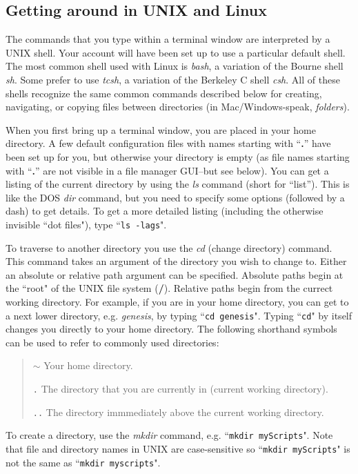 \documentclass[12pt]{article}
\begin{document}
\subsection*{Getting around in UNIX and Linux}

The commands that you type within a terminal window are interpreted by a UNIX shell. Your account will have been set up to use a particular default shell. The most common shell used with Linux is {\it bash}, a variation of the Bourne shell {\it sh}. Some prefer to use {\it tcsh}, a variation of the Berkeley C shell {\it csh}. All of these shells recognize the same common commands described below for creating, navigating, or copying files between directories (in Mac/Windows-speak, {\it folders}).

When you first bring up a terminal window, you are placed in your home directory. A few default configuration files with names starting with ``{\bf .}'' have been set up for you, but otherwise your directory is empty (as file names starting with ``{\bf .}'' are not visible in a file manager GUI--but see below). You can get a listing of the current directory by using the {\it ls} command (short for ``list''). This is like the DOS {\it dir} command, but you need to specify some options (followed by a dash) to get details. To get a more detailed listing (including the otherwise invisible ``dot files"), type ``{\tt ls -lags}".

To traverse to another directory you use the {\it cd} (change directory) command. This command takes an argument of the directory you wish to change to. Either an absolute or relative path argument can be specified. Absolute paths begin at the ``root" of the UNIX file system ({\bf /}). Relative paths begin from the currect working directory. For example, if you are in your home directory, you can get to a next lower directory, e.g. {\it genesis}, by typing ``{\tt cd genesis}". Typing ``{\tt cd}" by itself changes you directly to your home directory. The following shorthand symbols can be used to refer to commonly used directories:

\begin{quote}
   $\sim$ Your home directory.
	
   {\tt .} The directory that you are currently in (current working directory).
	
   {\tt ..} The directory immmediately above the current working directory. 
\end{quote}

To create a directory, use the {\it mkdir} command, e.g. ``{\tt mkdir myScripts}". Note that file and directory names in UNIX are case-sensitive so ``{\tt mkdir myScripts}" is not the same as ``{\tt mkdir myscripts}".
\end{document}
